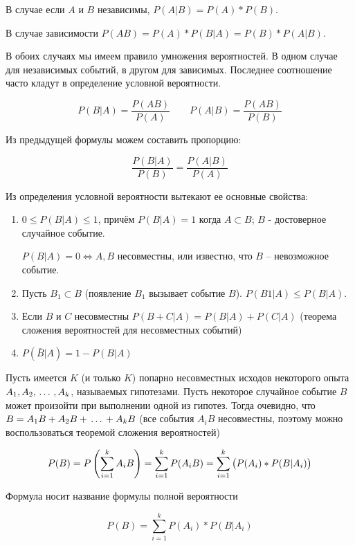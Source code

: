 \documentclass[a4paper,12pt]{report}
\begin{document}
	В случае если $A$ и $B$ независимы, $P(A|B) = P(A)*P(B)$. 

	В случае зависимости $P(AB) = P(A)*P(B|A) = P(B)*P(A|B)$. 

	В обоих случаях мы имеем правило умножения вероятностей. В одном случае для независимых событий, в другом для зависимых. Последнее соотношение часто кладут в определение условной вероятности. 

	$$
	  P(B|A) = \frac{P(AB)}{P(A)} \qquad 
	  P(A|B) = \frac{P(AB)}{P(B)}
	$$

	Из предыдущей формулы можем составить пропорцию: 
	
	$$
	  \frac{P(B|A)}{P(B)} = \frac{P(A|B)}{P(A)}
	$$

	Из определения условной вероятности вытекают ее основные свойства:


	\begin{enumerate}

	\item	$0 \leqslant P(B|A) \leqslant 1$, причём $P(B|A) = 1$ когда $A \subset B$; $B$ - достоверное случайное событие.

		$P(B|A) = 0 \Longleftrightarrow A, B$ несовместны, или известно, что $B$ – невозможное событие.

	
	\item	Пусть $B_1 \subset B$ (появление $B_1$ вызывает событие $B$). \; $P(B1|A) \leqslant P(B|A)$.


	\item	Если $B$ и $C$ несовместны $P(B+C|A) = P(B|A) + P(C|A)$ (теорема сложения вероятностей для несовместных событий)


	\item	$P(\bar B|A) =  1 - P(B|A)$

	\end{enumerate}


	 Пусть имеется $K$ (и только $K$) попарно несовместных исходов некоторого опыта $A_1,A_2, \,\ldots\, ,A_k$, называемых гипотезами. Пусть некоторое случайное событие $B$ может произойти при выполнении одной из гипотез. Тогда очевидно, что $B = A_1B + A_2B + \,\ldots\, + A_kB$ (все события $A_iB$ несовместны, поэтому можно воспользоваться теоремой сложения вероятностей)

	$$
	  P(B) = P\left(\sum^k_{i=1}A_iB\right)
	       = \sum^k_{i=1}P(A_iB) 
	       = \sum^k_{i=1}\left(P(A_i)*P(B|A_i)\strut\right)
	$$

	Формула носит название формулы полной вероятности 

	$$
	  P(B) = \sum^k_{i=1}P(A_i)*P(B|A_i)
	$$
\end{document}

